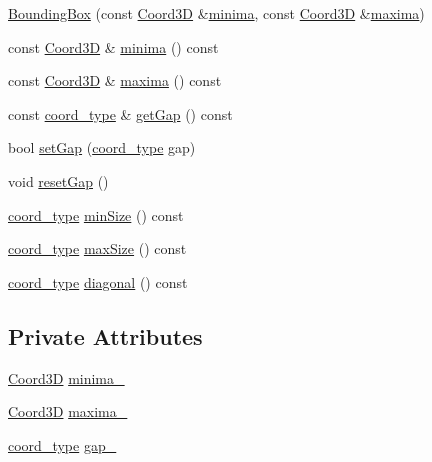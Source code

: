 \begin{DoxyCompactItemize}
\item 
\hyperlink{classMcCAD_1_1Geometry_1_1BoundingBox_a7ed4eaad9315ad7414c2518ef49e2af5}{Bounding\+Box} (const \hyperlink{classMcCAD_1_1Geometry_1_1Coord3D}{Coord3D} \&\hyperlink{classMcCAD_1_1Geometry_1_1BoundingBox_a571f053b8fc4575dfe5857df084b6e19}{minima}, const \hyperlink{classMcCAD_1_1Geometry_1_1Coord3D}{Coord3D} \&\hyperlink{classMcCAD_1_1Geometry_1_1BoundingBox_abecf8327e0985ccbc63f167da3aaf763}{maxima})
\item 
const \hyperlink{classMcCAD_1_1Geometry_1_1Coord3D}{Coord3D} \& \hyperlink{classMcCAD_1_1Geometry_1_1BoundingBox_a9e1e0e801553cdabc4e5e370badd5e22}{minima} () const
\item 
const \hyperlink{classMcCAD_1_1Geometry_1_1Coord3D}{Coord3D} \& \hyperlink{classMcCAD_1_1Geometry_1_1BoundingBox_a27a33efbf58672db1c6d654fb9727aee}{maxima} () const
\item 
const \hyperlink{namespaceMcCAD_1_1Geometry_ac043b37a4a7e849fca22869e1982d2f8}{coord\+\_\+type} \& \hyperlink{classMcCAD_1_1Geometry_1_1BoundingBox_adbe61ac8fb863c3370a96cc37eccd820}{get\+Gap} () const
\item 
bool \hyperlink{classMcCAD_1_1Geometry_1_1BoundingBox_a78c149a7c7e7d6074a2b726a63c3c400}{set\+Gap} (\hyperlink{namespaceMcCAD_1_1Geometry_ac043b37a4a7e849fca22869e1982d2f8}{coord\+\_\+type} gap)
\item 
void \hyperlink{classMcCAD_1_1Geometry_1_1BoundingBox_abdedc7a259eca39fbfab2fa8fdd17a07}{reset\+Gap} ()
\item 
\hyperlink{namespaceMcCAD_1_1Geometry_ac043b37a4a7e849fca22869e1982d2f8}{coord\+\_\+type} \hyperlink{classMcCAD_1_1Geometry_1_1BoundingBox_aa9ebd35538bff8861f199f37c34e086b}{min\+Size} () const
\item 
\hyperlink{namespaceMcCAD_1_1Geometry_ac043b37a4a7e849fca22869e1982d2f8}{coord\+\_\+type} \hyperlink{classMcCAD_1_1Geometry_1_1BoundingBox_a27a008c7c82c9fdc8489e9c877a744a8}{max\+Size} () const
\item 
\hyperlink{namespaceMcCAD_1_1Geometry_ac043b37a4a7e849fca22869e1982d2f8}{coord\+\_\+type} \hyperlink{classMcCAD_1_1Geometry_1_1BoundingBox_a2ffebee933ad8a3fa968a9f614cda1ea}{diagonal} () const
\end{DoxyCompactItemize}
\subsection*{Private Attributes}
\begin{DoxyCompactItemize}
\item 
\hyperlink{classMcCAD_1_1Geometry_1_1Coord3D}{Coord3D} \hyperlink{classMcCAD_1_1Geometry_1_1BoundingBox_a2fbfb7dc1c01528377da86ff313fc6e6}{minima\+\_\+}
\item 
\hyperlink{classMcCAD_1_1Geometry_1_1Coord3D}{Coord3D} \hyperlink{classMcCAD_1_1Geometry_1_1BoundingBox_aa69d74a92caca3795ecd4089c3f71a87}{maxima\+\_\+}
\item 
\hyperlink{namespaceMcCAD_1_1Geometry_ac043b37a4a7e849fca22869e1982d2f8}{coord\+\_\+type} \hyperlink{classMcCAD_1_1Geometry_1_1BoundingBox_a1da14473a49c952f47135446c3c90ae9}{gap\+\_\+}
\end{DoxyCompactItemize}


